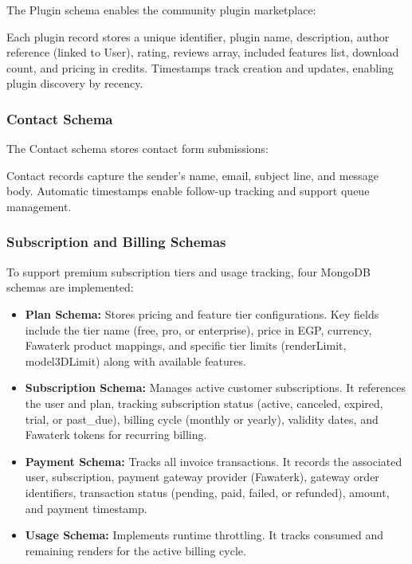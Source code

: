 The Plugin schema enables the community plugin marketplace:

Each plugin record stores a unique identifier, plugin name, description, author reference (linked to User), rating, reviews array, included features list, download count, and pricing in credits. Timestamps track creation and updates, enabling plugin discovery by recency.

\subsubsection{Contact Schema}

The Contact schema stores contact form submissions:

Contact records capture the sender's name, email, subject line, and message body. Automatic timestamps enable follow-up tracking and support queue management.

\subsubsection{Subscription and Billing Schemas}

To support premium subscription tiers and usage tracking, four MongoDB schemas are implemented:

\begin{itemize}
    \item \textbf{Plan Schema:} Stores pricing and feature tier configurations. Key fields include the tier name (free, pro, or enterprise), price in EGP, currency, Fawaterk product mappings, and specific tier limits (renderLimit, model3DLimit) along with available features.
    \item \textbf{Subscription Schema:} Manages active customer subscriptions. It references the user and plan, tracking subscription status (active, canceled, expired, trial, or past\_due), billing cycle (monthly or yearly), validity dates, and Fawaterk tokens for recurring billing.
    \item \textbf{Payment Schema:} Tracks all invoice transactions. It records the associated user, subscription, payment gateway provider (Fawaterk), gateway order identifiers, transaction status (pending, paid, failed, or refunded), amount, and payment timestamp.
    \item \textbf{Usage Schema:} Implements runtime throttling. It tracks consumed and remaining renders for the active billing cycle.
\end{itemize}

